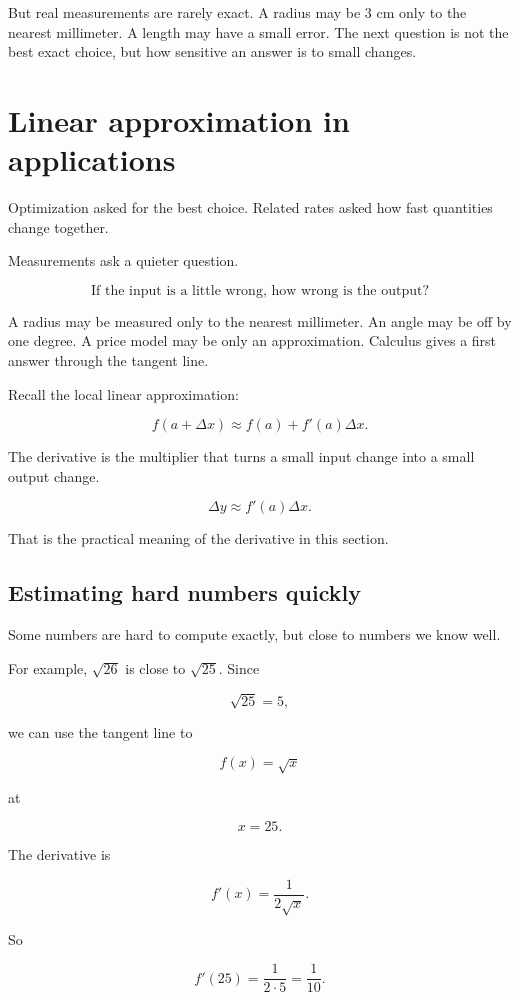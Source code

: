 But real measurements are rarely exact.  A radius may be \(3\) cm only to the nearest
millimeter.  A length may have a small error.  The next question is not the best exact
choice, but how sensitive an answer is to small changes.
\section{Linear approximation in applications}
\label{sec:linear-approximation-applications}

Optimization asked for the best choice.  Related rates asked how fast quantities
change together.

Measurements ask a quieter question.

\[
\text{If the input is a little wrong, how wrong is the output?}
\]

A radius may be measured only to the nearest millimeter.  An angle may be off by
one degree.  A price model may be only an approximation.  Calculus gives a first
answer through the tangent line.

Recall the local linear approximation:

\[
f(a+\Delta x)\approx f(a)+f'(a)\Delta x.
\]

The derivative is the multiplier that turns a small input change into a small output
change.

\[
\Delta y\approx f'(a)\Delta x.
\]

That is the practical meaning of the derivative in this section.

\subsection{Estimating hard numbers quickly}
\label{subsec:estimating-hard-numbers-quickly}

Some numbers are hard to compute exactly, but close to numbers we know well.

For example, \(\sqrt{26}\) is close to \(\sqrt{25}\).  Since

\[
\sqrt{25}=5,
\]

we can use the tangent line to

\[
f(x)=\sqrt{x}
\]

at

\[
x=25.
\]

The derivative is

\[
f'(x)=\frac{1}{2\sqrt{x}}.
\]

So

\[
f'(25)=\frac{1}{2\cdot5}=\frac{1}{10}.
\]

